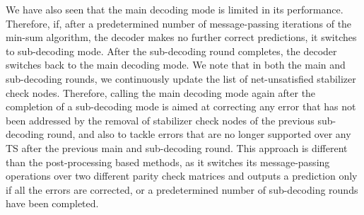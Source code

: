 \documentclass[%
 reprint,
 amsmath,amssymb,
 aps,
pra,
showkeys,
]{revtex4-2}
\begin{document}
We have also seen that the main decoding mode is limited in its performance.
Therefore, if, after a predetermined number of message-passing iterations of the min-sum algorithm, the decoder makes no further correct predictions, it switches to sub-decoding mode.
After the sub-decoding round completes, the decoder switches back to the main decoding mode.
We note that in both the main and sub-decoding rounds, we continuously update the list of net-unsatisfied stabilizer check nodes.
Therefore, calling the main decoding mode again after the completion of a sub-decoding mode is aimed at correcting any error that has not been addressed by the removal of stabilizer check nodes of the previous sub-decoding round, and also to tackle errors that are no longer supported over any TS after the previous main and sub-decoding round.
This approach is different than the post-processing based methods, as it switches its message-passing operations over two different parity check matrices and outputs a prediction only if all the errors are corrected, or a predetermined number of sub-decoding rounds have been completed.
\end{document}
